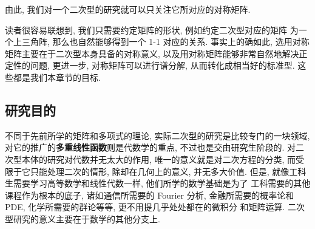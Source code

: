 \documentclass[UTF8]{book}
\begin{document}
由此, 我们对一个二次型的研究就可以只关注它所对应的对称矩阵. 

读者很容易联想到, 我们只需要约定矩阵的形状, 例如约定二次型对应的矩阵
为一个上三角阵, 那么也自然能够得到一个 1-1 对应的关系. 
事实上的确如此, 选用对称矩阵主要在于二次型本身具备的对称意义, 
以及用对称矩阵能够非常自然地解决正定性的问题, 
更进一步, 对称矩阵可以进行谱分解, 从而转化成相当好的标准型. 
这些都是我们本章节的目标. 

\subsection{研究目的}

不同于先前所学的矩阵和多项式的理论, 实际二次型的研究是比较专门的一块领域, 
对它的推广的\textbf{多重线性函数}则是代数学的重点, 不过也是交由研究生阶段的. 
对二次型本体的研究对代数并无太大的作用, 唯一的意义就是对二次方程的分类, 
而受限于它只能处理二次的情形, 除却在几何上的意义, 并无多大价值. 
但是, 就像工科生需要学习高等数学和线性代数一样, 他们所学的数学基础是为了
工科需要的其他课程作为根本的底子, 诸如通信所需要的 Fourier 分析, 
金融所需要的概率论和 PDE, 化学所需要的群论等等, 更不用提几乎处处都在的微积分
和矩阵运算. 二次型研究的意义主要在于数学的其他分支上. 
\end{document}
